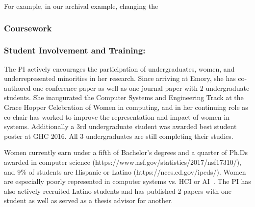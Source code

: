 For example, in our archival example, changing the  

\subsubsection*{Coursework}

\subsubsection*{Student Involvement and Training: }%
The PI actively encourages the participation of undergraduates, women, and
underrepresented minorities in her research.  Since arriving at Emory, she has
co-authored one conference paper as well as one journal paper with 2
undergraduate students.    
She inaugurated the Computer Systems and Engineering Track at the Grace Hopper
Celebration of Women in computing, and in her continuing role as co-chair has
worked to improve the representation and impact of women in systems.  
Additionally a 3rd undergraduate student was awarded best student
poster at GHC 2016.  All 3 undergraduates are still completing their studies.

Women currently earn under a fifth of Bachelor's degrees and a quarter of Ph.Ds awarded in computer science
(https://www.nsf.gov/statistics/2017/nsf17310/), and 
9\% of students are Hispanic or Latino (https://nces.ed.gov/ipeds/).  Women are
especially poorly represented in computer systems vs. HCI or AI~\cite{TK}.
The PI has also actively recruited Latino students and has published 2 papers
with one student as well as served as a thesis advisor for another.  


